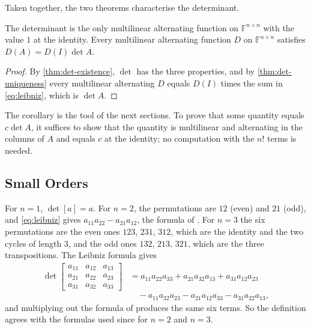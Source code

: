 Taken together, the two theorems characterise the determinant.

\begin{corollary}
\label{cor:det-characterisation}
The determinant is the only multilinear alternating function on $\mathbb F^{n\times n}$ with the value $1$ at the identity. Every multilinear alternating function $D$ on $\mathbb F^{n\times n}$ satisfies $D(A)=D(I)\det A$.
\end{corollary}

\begin{proof}
By \cref{thm:det-existence}, $\det$ has the three properties, and by \cref{thm:det-uniqueness} every multilinear alternating $D$ equals $D(I)$ times the sum in \eqref{eq:leibniz}, which is $\det A$.
\end{proof}

The corollary is the tool of the next sections. To prove that some quantity equals $c\det A$, it suffices to show that the quantity is multilinear and alternating in the columns of $A$ and equals $c$ at the identity; no computation with the $n!$ terms is needed.

\subsection{Small Orders}

For $n=1$, $\det[a]=a$. For $n=2$, the permutations are $12$ (even) and $21$ (odd), and \eqref{eq:leibniz} gives $a_{11}a_{22}-a_{21}a_{12}$, the formula of . For $n=3$ the six permutations are the even ones $123$, $231$, $312$, which are the identity and the two cycles of length $3$, and the odd ones $132$, $213$, $321$, which are the three transpositions. The Leibniz formula gives
\begin{equation}
\begin{aligned}
\det\begin{bmatrix}a_{11}&a_{12}&a_{13}\\a_{21}&a_{22}&a_{23}\\a_{31}&a_{32}&a_{33}\end{bmatrix}
&=a_{11}a_{22}a_{33}+a_{21}a_{32}a_{13}+a_{31}a_{12}a_{23}\\
&\quad-a_{11}a_{32}a_{23}-a_{21}a_{12}a_{33}-a_{31}a_{22}a_{13},
\end{aligned}
\label{eq:det3}
\end{equation}
and multiplying out the formula of  produces the same six terms. So the definition agrees with the formulas used since  for $n=2$ and $n=3$.

